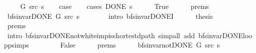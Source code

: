 \begin{isabellebody}
\ \ \isamarkupfalse%
\ {\isacharparenleft}{\kern0pt}{}\ G\ src\ s{\isacharparenright}{\kern0pt}\isanewline
\ \ \isamarkupfalse%
\ {\isacharquery}{\kern0pt}case\isanewline
\ \ \isamarkupfalse%
\ {\isacharparenleft}{\kern0pt}cases\ {\isachardoublequoteopen}DONE\ s{\isachardoublequoteclose}{\isacharparenright}{\kern0pt}\isanewline
\ \ \ \ \isamarkupfalse%
\ True\isanewline
\ \ \ \ \isamarkupfalse%
\ {\isachardoublequoteopen}{}{\isachardot}{\kern0pt}prems{\isachardoublequoteclose}{\isacharparenleft}{\kern0pt}{}{\isacharparenright}{\kern0pt}\isanewline
\ \ \ \ \isamarkupfalse%
\ {\isachardoublequoteopen}bfs{\isacharunderscore}{\kern0pt}invar{\isacharunderscore}{\kern0pt}DONE{\isacharprime}{\kern0pt}\ G\ src\ s{\isachardoublequoteclose}\isanewline
\ \ \ \ \ \ \isamarkupfalse%
\ {\isacharparenleft}{\kern0pt}intro\ bfs{\isacharunderscore}{\kern0pt}invar{\isacharunderscore}{\kern0pt}DONE{\isacharprime}{\kern0pt}I{\isacharparenright}{\kern0pt}\isanewline
\ \ \ \ \isamarkupfalse%
\ {\isacharquery}{\kern0pt}thesis\isanewline
\ \ \ \ \ \ \isamarkupfalse%
\ {\isachardoublequoteopen}{}{\isachardot}{\kern0pt}prems{\isachardoublequoteclose}{\isacharparenleft}{\kern0pt}{}{\isacharparenright}{\kern0pt}\isanewline
\ \ \ \ \ \ \isamarkupfalse%
\ {\isacharparenleft}{\kern0pt}intro\ bfs{\isacharunderscore}{\kern0pt}invar{\isacharunderscore}{\kern0pt}DONE{\isachardot}{\kern0pt}not{\isacharunderscore}{\kern0pt}white{\isacharunderscore}{\kern0pt}imp{\isacharunderscore}{\kern0pt}is{\isacharunderscore}{\kern0pt}shortest{\isacharunderscore}{\kern0pt}dpath{\isacharparenright}{\kern0pt}\ {\isacharparenleft}{\kern0pt}simp{\isacharunderscore}{\kern0pt}all\ add{\isacharcolon}{\kern0pt}\ bfs{\isacharunderscore}{\kern0pt}invar{\isacharunderscore}{\kern0pt}DONE{\isachardot}{\kern0pt}loop{\isacharunderscore}{\kern0pt}psimps{\isacharparenright}{\kern0pt}\isanewline
\ \ \isamarkupfalse%
\isanewline
\ \ \ \ \isamarkupfalse%
\ False\isanewline
\ \ \ \ \isamarkupfalse%
\ {\isachardoublequoteopen}{}{\isachardot}{\kern0pt}prems{\isachardoublequoteclose}{\isacharparenleft}{\kern0pt}{}{\isacharparenright}{\kern0pt}\isanewline
\ \ \ \ \isamarkupfalse%
\ {\isachardoublequoteopen}bfs{\isacharunderscore}{\kern0pt}invar{\isacharunderscore}{\kern0pt}not{\isacharunderscore}{\kern0pt}DONE{\isacharprime}{\kern0pt}\ G\ src\ s{\isachardoublequoteclose}\isanewline

\end{isabellebody}
